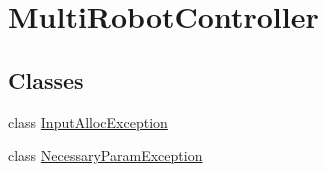 \hypertarget{group__MultiRobotController}{}\section{Multi\+Robot\+Controller}
\label{group__MultiRobotController}
\subsection*{Classes}
\begin{DoxyCompactItemize}
\item 
class \hyperlink{classInputAllocException}{Input\+Alloc\+Exception}
\item 
class \hyperlink{classNecessaryParamException}{Necessary\+Param\+Exception}
\end{DoxyCompactItemize}
